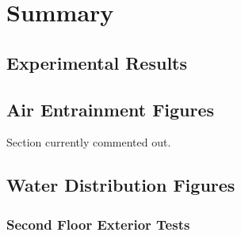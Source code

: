 \documentclass{article}
\begin{document}
\section{Summary}



\printbibliography

\clearpage

\begin{appendices}

\section{Experimental Results} \label{App:Results}
\renewcommand{\thesubsection}{\Alph{section}}

\appendix


\subsection{Air Entrainment Figures}
\label{app:Air_Entrainment_Figures}

Section currently commented out.

\subsection{Water Distribution Figures}
\label{app:Water_Distribution_Figures}

\subsubsection{Second Floor Exterior Tests}


\end{appendices}
\end{document}

